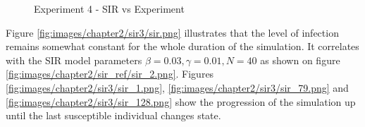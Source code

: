 \begin{figure}[H]
    \centering
    \hspace*{\fill}
    \caption{Experiment 4 - SIR vs Experiment} \label{fig:experiment4-diagrams}
\end{figure}

Figure \ref{fig:images/chapter2/sir3/sir.png} illustrates that the level of infection remains somewhat constant for the whole duration of the simulation.
It correlates with the SIR model parameters $\beta = 0.03, \gamma = 0.01, N = 40$ as shown on figure \ref{fig:images/chapter2/sir_ref/sir_2.png}.
Figures \ref{fig:images/chapter2/sir3/sir_1.png}, \ref{fig:images/chapter2/sir3/sir_79.png} and \ref{fig:images/chapter2/sir3/sir_128.png} show the progression of the simulation up until the last susceptible individual changes state.

